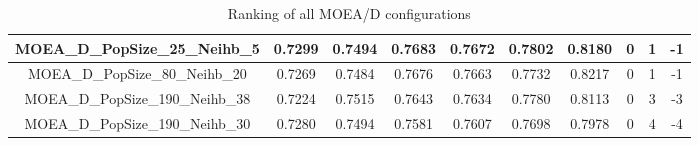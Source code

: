 \begin{table}[!h]
{\begin{tabular}{|c|c|c|c|c|c|c|c|c|c|}
MOEA\_D\_PopSize\_25\_Neihb\_5    & 0.7299        & 0.7494           & 0.7683          & 0.7672        & 0.7802           & 0.8180        & 0          & 1          & -1               \\ \hline
MOEA\_D\_PopSize\_80\_Neihb\_20   & 0.7269        & 0.7484           & 0.7676          & 0.7663        & 0.7732           & 0.8217        & 0          & 1          & -1               \\ \hline
MOEA\_D\_PopSize\_190\_Neihb\_38  & 0.7224        & 0.7515           & 0.7643          & 0.7634        & 0.7780           & 0.8113        & 0          & 3          & -3               \\ \hline
MOEA\_D\_PopSize\_190\_Neihb\_30  & 0.7280        & 0.7494           & 0.7581          & 0.7607        & 0.7698           & 0.7978        & 0          & 4          & -4               \\ \hline
\end{tabular}%
}
\caption{Ranking of all MOEA/D configurations}
\label{ranking}
\end{table}
